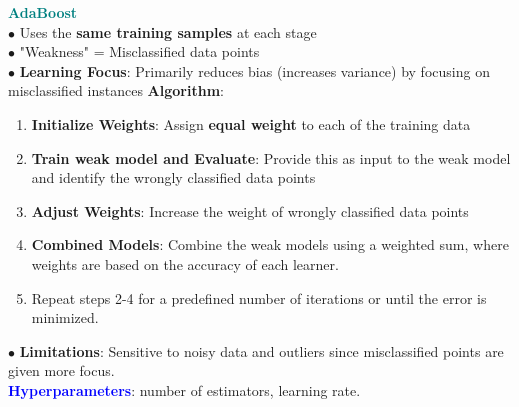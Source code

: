 \documentclass[letterpaper, 10.5pt,landscape]{article}
\begin{document}
\begin{multicols*}{3}
\vspace{3pt}
\textcolor{teal}{\textbf{AdaBoost}} \\

$\bullet$ Uses the \textbf{same training samples} at each stage \\
$\bullet$ "Weakness" =  Misclassified data points \\
$\bullet$ \textbf{Learning Focus}: Primarily reduces bias (increases variance) by focusing on misclassified instances
\textbf{Algorithm}:
\vspace{-3pt}
\begin{enumerate}
    \item \textbf{Initialize Weights}: Assign \textbf{equal weight} to each of the training data 
    \vspace{-3pt}
    \item \textbf{Train weak model and Evaluate}: Provide this as input to the weak model and identify the wrongly classified data points
    \vspace{-3pt}
    \item \textbf{Adjust Weights}: Increase the weight of wrongly classified data points
      \vspace{-3pt}
    \item \textbf{Combined Models}: Combine the weak models using a weighted sum, where weights are based on the accuracy of each learner.
    \vspace{-3pt}
    \item Repeat steps 2-4 for a predefined number of iterations or until the error is minimized.
\end{enumerate}
$\bullet$ \textbf{Limitations}: Sensitive to noisy data and outliers since misclassified points are given more focus. \\

\textbf{\textcolor{blue}{Hyperparameters}}: number of estimators, learning rate.



\end{multicols*}
\end{document}
